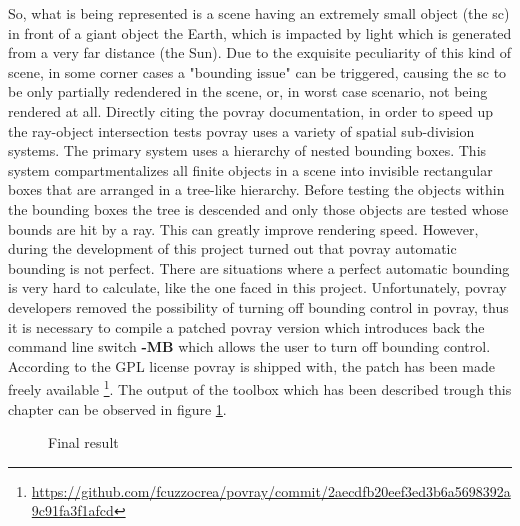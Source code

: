 So, what is being represented is a scene having an extremely small object (the \acrshort{sc}) in front of a giant object {the Earth}, which is impacted by light which is generated from a very far distance (the Sun). Due to the exquisite peculiarity of this kind of scene, in some corner cases a "bounding issue" can be triggered, causing the \acrshort{sc} to be only partially redendered in the scene, or, in worst case scenario, not being rendered at all. Directly citing the \acrshort{povray} documentation, in order to speed up the ray-object intersection tests \acrshort{povray} uses a variety of spatial sub-division systems. The primary system uses a hierarchy of nested bounding boxes. This system compartmentalizes all finite objects in a scene into invisible rectangular boxes that are arranged in a tree-like hierarchy. Before testing the objects within the bounding boxes the tree is descended and only those objects are tested whose bounds are hit by a ray. This can greatly improve rendering speed. However, during the development of this project turned out that \acrshort{povray} automatic bounding is not perfect. There are situations where a perfect automatic bounding is very hard to calculate, like the one faced in this project. Unfortunately, \acrshort{povray} developers removed the possibility of turning off bounding control in \acrshort{povray}, thus it is necessary to compile a patched \acrshort{povray} version which introduces back the command line switch \textbf{-MB} which allows the user to turn off bounding control. According to the GPL license \acrshort{povray} is shipped with, the patch has been made freely available \footnote{\url{https://github.com/fcuzzocrea/povray/commit/2aecdfb20eef3ed3b6a5698392a9c91fa3f1afcd}}.
The output of the toolbox which has been described trough this chapter can be observed in figure \ref{fig:finalResult}.

\begin{figure}[htbp]
  \centering
  \qquad
  \qquad
  \qquad
  \qquad
  \qquad
  \caption{Final result}
  \label{fig:finalResult}
\end{figure}